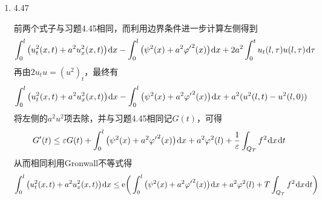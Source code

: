 \documentclass[a4paper,UTF8,fontset=windows,10pt]{ctexart}
\newcommand*{\dr}{\hspace{0.07em}\mathrm{d}}
\newcommand*{\er}{\mathrm{e}}
\begin{document}
\begin{enumerate}
    \item 4.47
    
    前两个式子与习题4.45相同，而利用边界条件进一步计算左侧得到
    $$\int_0^l\big(u_t^2(x,t)+a^2u_x^2(x,t)\big)\dr x-\int_0^l\big(\psi^2(x)+a^2{\varphi'}^2(x)\big)\dr x+2a^2\int_0^t u_t(l,\tau)u(l,\tau)\dr\tau$$
    再由$2u_tu=(u^2)_t$，最终有
    $$\int_0^l\big(u_t^2(x,t)+a^2u_x^2(x,t)\big)\dr x-\int_0^l\big(\psi^2(x)+a^2{\varphi'}^2(x)\big)\dr x+a^2(u^2(l,t)-u^2(l,0))$$
    将左侧的$a^2u^2$项去除，并与习题4.45相同记$G(t)$，可得
    $$G'(t)\le\varepsilon G(t)+\int_0^l\big(\psi^2(x)+a^2{\varphi'}^2(x)\big)\dr x+a^2\varphi^2(l)+\frac{1}{\varepsilon}\int_{Q_T}f^2\dr x\dr t$$
    从而相同利用Gronwall不等式得
    $$\int_0^l\big(u_t^2(x,t)+a^2u_x^2(x,t)\big)\dr x\le\er\bigg(\int_0^l\big(\psi^2(x)+a^2{\varphi'}^2(x)\big)\dr x+a^2\varphi^2(l)+T\int_{Q_T}f^2\dr x\dr t\bigg)$$    
\end{enumerate}
\end{document}

